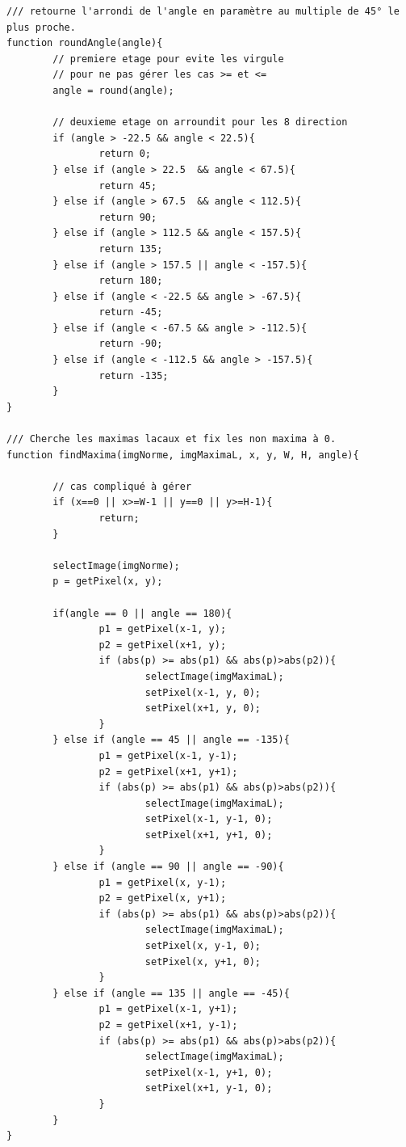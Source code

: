 \documentclass[a4paper,11pt]{article}
\begin{document}
\begin{lstlisting}[caption=Macro de calcul des maxima locaux]
/// retourne l'arrondi de l'angle en paramètre au multiple de 45° le plus proche.
function roundAngle(angle){
        // premiere etage pour evite les virgule 
        // pour ne pas gérer les cas >= et <=
        angle = round(angle);

        // deuxieme etage on arroundit pour les 8 direction
        if (angle > -22.5 && angle < 22.5){
                return 0;
        } else if (angle > 22.5  && angle < 67.5){
                return 45;
        } else if (angle > 67.5  && angle < 112.5){
                return 90;
        } else if (angle > 112.5 && angle < 157.5){
                return 135;
        } else if (angle > 157.5 || angle < -157.5){
                return 180;
        } else if (angle < -22.5 && angle > -67.5){
                return -45;
        } else if (angle < -67.5 && angle > -112.5){
                return -90;
        } else if (angle < -112.5 && angle > -157.5){
                return -135;
        }
}

/// Cherche les maximas lacaux et fix les non maxima à 0. 
function findMaxima(imgNorme, imgMaximaL, x, y, W, H, angle){

        // cas compliqué à gérer
        if (x==0 || x>=W-1 || y==0 || y>=H-1){
                return;
        }
        
        selectImage(imgNorme);
        p = getPixel(x, y);

        if(angle == 0 || angle == 180){
                p1 = getPixel(x-1, y);
                p2 = getPixel(x+1, y);
                if (abs(p) >= abs(p1) && abs(p)>abs(p2)){
                        selectImage(imgMaximaL);
                        setPixel(x-1, y, 0);
                        setPixel(x+1, y, 0);
                }
        } else if (angle == 45 || angle == -135){
                p1 = getPixel(x-1, y-1);
                p2 = getPixel(x+1, y+1);
                if (abs(p) >= abs(p1) && abs(p)>abs(p2)){
                        selectImage(imgMaximaL);
                        setPixel(x-1, y-1, 0);
                        setPixel(x+1, y+1, 0);
                }
        } else if (angle == 90 || angle == -90){
                p1 = getPixel(x, y-1);
                p2 = getPixel(x, y+1);
                if (abs(p) >= abs(p1) && abs(p)>abs(p2)){
                        selectImage(imgMaximaL);
                        setPixel(x, y-1, 0);
                        setPixel(x, y+1, 0);
                }
        } else if (angle == 135 || angle == -45){
                p1 = getPixel(x-1, y+1);
                p2 = getPixel(x+1, y-1);
                if (abs(p) >= abs(p1) && abs(p)>abs(p2)){
                        selectImage(imgMaximaL);
                        setPixel(x-1, y+1, 0);
                        setPixel(x+1, y-1, 0);
                }
        }
}


\end{lstlisting}
\end{document}
